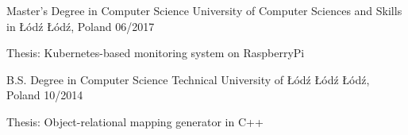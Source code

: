 

\begin{cventries}

  \cventry
    {Master's Degree in Computer Science} %
    {University of Computer Sciences and Skills in Łódź} %
    {Łódź, Poland} %
    {06/2017} %
    {
      \begin{cvitems} %
        \item {Thesis: Kubernetes-based monitoring system on RaspberryPi}
      \end{cvitems}
    }

  \cventry
  {B.S. Degree in Computer Science} %
  {Technical University of Łódź Łódź} %
  {Łódź, Poland} %
  {10/2014} %
  {
  \begin{cvitems} %
    \item {Thesis: Object-relational mapping generator in C++}
  \end{cvitems}
  }

\end{cventries}
